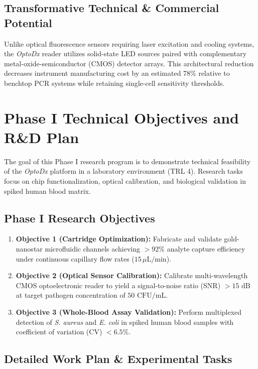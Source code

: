 \documentclass[11pt,a4paper]{scrartcl}
\begin{document}
\subsection{Transformative Technical \& Commercial Potential}
Unlike optical fluorescence sensors requiring laser excitation and cooling systems, the \emph{OptoDx} reader utilizes solid-state LED sources paired with complementary metal-oxide-semiconductor (CMOS) detector arrays. This architectural reduction decreases instrument manufacturing cost by an estimated 78\% relative to benchtop PCR systems while retaining single-cell sensitivity thresholds.

\section{Phase I Technical Objectives and R\&D Plan}

The goal of this Phase I research program is to demonstrate technical feasibility of the \emph{OptoDx} platform in a laboratory environment (TRL 4). Research tasks focus on chip functionalization, optical calibration, and biological validation in spiked human blood matrix.

\subsection{Phase I Research Objectives}
\begin{enumerate}
    \item \textbf{Objective 1 (Cartridge Optimization):} Fabricate and validate gold-nanostar microfluidic channels achieving $> 92\%$ analyte capture efficiency under continuous capillary flow rates ($15\,\mu\text{L/min}$).
    \item \textbf{Objective 2 (Optical Sensor Calibration):} Calibrate multi-wavelength CMOS optoelectronic reader to yield a signal-to-noise ratio (SNR) $> 15\text{ dB}$ at target pathogen concentration of $50\text{ CFU/mL}$.
    \item \textbf{Objective 3 (Whole-Blood Assay Validation):} Perform multiplexed detection of \emph{S. aureus} and \emph{E. coli} in spiked human blood samples with coefficient of variation (CV) $< 6.5\%$.
\end{enumerate}

\subsection{Detailed Work Plan \& Experimental Tasks}
\end{document}
